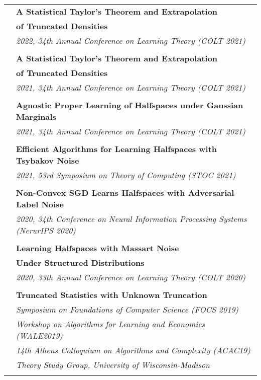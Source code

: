 \documentclass[letterpaper,11pt,oneside]{article}
\begin{document}
\begin{longtable}{@{} l l}
 &\textbf{A Statistical Taylor's Theorem and Extrapolation}\\
 & \textbf{of Truncated Densities}\\
 & \emph{2022, 34th Annual Conference on Learning Theory (COLT 2021)} \\
 & \\

 &\textbf{A Statistical Taylor's Theorem and Extrapolation}\\
 & \textbf{of Truncated Densities}\\
 & \emph{2021, 34th Annual Conference on Learning Theory (COLT 2021)} \\
 & \\

 &\textbf{Agnostic Proper Learning of Halfspaces under Gaussian Marginals}\\
 & \emph{2021, 34th Annual Conference on Learning Theory (COLT 2021)} \\
 & \\

 &\textbf{Efficient Algorithms for Learning Halfspaces with Tsybakov Noise} \\
 & \emph{2021, 53rd Symposium on Theory of Computing (STOC 2021)} \\
 & \\

     &\textbf{Non-Convex SGD Learns Halfspaces with Adversarial Label Noise} \\
     & \emph{2020, 34th Conference on Neural Information Processing Systems (NerurIPS 2020)} \\
     & \\

     &\textbf{Learning Halfspaces with Massart Noise}\\
     &\textbf{Under Structured Distributions}\\
     & \emph{2020, 33th Annual Conference on Learning Theory (COLT 2020) } \\
     & \\

 &\textbf{Truncated Statistics with Unknown Truncation}\\
 &\emph{Symposium on Foundations of Computer Science (FOCS 2019)}\\
 &\emph{Workshop on Algorithms for Learning and Economics (WALE2019)}\\
 &\emph{14th Athens Colloquium on Algorithms and Complexity (ACAC19)}\\
 &\emph{Theory Study Group, University of Wisconsin-Madison}\\
 &\\


\end{longtable}
\end{document}
